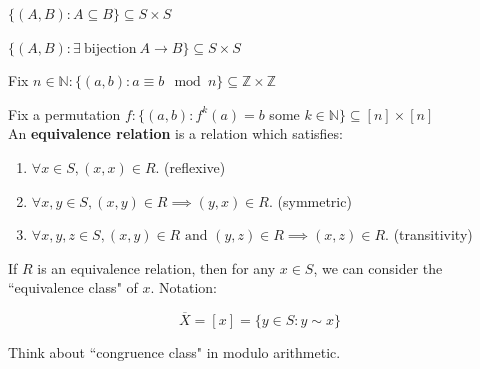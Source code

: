 \documentclass[a4paper, 11pt, twoside]{article}
\begin{document}
$\{(A, B): A\subseteq B\} \subseteq S\times S$

$\{(A, B): \exists\ \text{bijection}\ A \rightarrow B\}\subseteq S\times S$

Fix $n\in\mathbb{N}: \{(a, b): a\equiv b\mod n\}\subseteq \mathbb{Z}\times\mathbb{Z}$

Fix a permutation $f: \{(a, b): f^k(a)=b$ some $k\in\mathbb{N}\}\subseteq[n]\times [n]$\\

An \textbf{equivalence relation} is a relation which satisfies:

\begin{enumerate}
	\item $\forall x\in S, (x,x)\in R$. (reflexive)
	\item $\forall x, y\in S, (x,y)\in R\implies (y,x)\in R$. (symmetric)
	\item $\forall x, y, z \in S, (x,y)\in R \text{ and } (y,z)\in R \implies (x,z)\in R$. (transitivity)
\end{enumerate}

If $R$ is an equivalence relation, then for any $x\in S$, we can consider the ``equivalence class" of $x$. Notation:

\[\overline{X}=[x] = \{y\in S: y\sim x\}\]

Think about ``congruence class" in modulo arithmetic.
\end{document}
